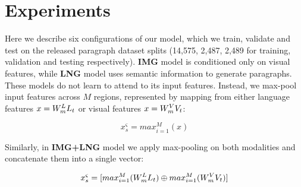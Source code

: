 \documentclass[11pt,a4paper]{article}
\begin{document}

\section{Experiments}



Here we describe six configurations of our model, which we train, validate and test on the released paragraph dataset splits (14,575, 2,487, 2,489 for training, validation and testing respectively).
\textbf{IMG} model is conditioned only on visual features, while \textbf{LNG} model uses semantic information to generate paragraphs.
These models do not learn to attend to its input features.
Instead, we max-pool input features across $M$ regions, represented by mapping from either language features $x=W_{m}\sp{L} L_t$ or visual features $x=W_{m}\sp{V} V_t$:

\begin{equation}
  x^\varsigma_s = max_{i=1}^M(x)
  \label{eqn:maxpool}
\end{equation}

Similarly, in \textbf{IMG+LNG} model we apply max-pooling on both modalities and concatenate them into a single vector:

\begin{equation}
  x^\varsigma_s = [max_{i=1}^M(W_{m}\sp{L} L_t) \oplus max_{i=1}^M(W_{m}\sp{V} V_t)]
  \label{eqn:maxpool}
\end{equation}
\end{document}
